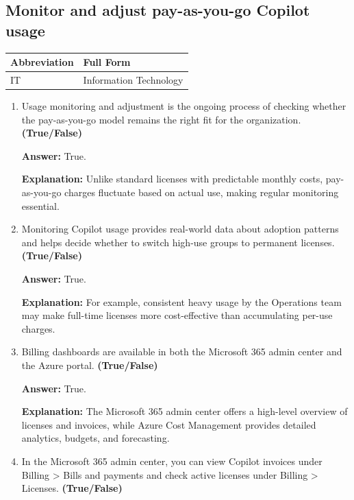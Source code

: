 \documentclass[10pt]{article}
\begin{document}
\subsection{Monitor and adjust pay-as-you-go Copilot usage}

\begin{center}
\begin{tabular}{>{\raggedright\arraybackslash}p{} >{\raggedright\arraybackslash}p{}}
\toprule
\textbf{Abbreviation} & \textbf{Full Form} \\
\midrule
IT & Information Technology \\
\end{tabular}
\end{center}

\begin{enumerate}[leftmargin=*]

\item Usage monitoring and adjustment is the ongoing process of checking whether the pay-as-you-go model remains the right fit for the organization. \textbf{(True/False)}

\textbf{Answer:} True.

\textbf{Explanation:} Unlike standard licenses with predictable monthly costs, pay-as-you-go charges fluctuate based on actual use, making regular monitoring essential.

\item Monitoring Copilot usage provides real-world data about adoption patterns and helps decide whether to switch high-use groups to permanent licenses. \textbf{(True/False)}

\textbf{Answer:} True.

\textbf{Explanation:} For example, consistent heavy usage by the Operations team may make full-time licenses more cost-effective than accumulating per-use charges.

\item Billing dashboards are available in both the Microsoft 365 admin center and the Azure portal. \textbf{(True/False)}

\textbf{Answer:} True.

\textbf{Explanation:} The Microsoft 365 admin center offers a high-level overview of licenses and invoices, while Azure Cost Management provides detailed analytics, budgets, and forecasting.

\item In the Microsoft 365 admin center, you can view Copilot invoices under Billing > Bills and payments and check active licenses under Billing > Licenses. \textbf{(True/False)}


\end{enumerate}
\end{document}
